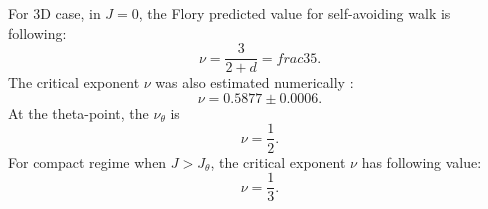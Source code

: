 For 3D case, in $J=0$, the Flory predicted value for self-avoiding walk is following:
\begin{equation}
\label{eq:nu_3D_J0_flory}
 \nu = \frac{3}{2+d} = frac{3}{5}.
\end{equation}
The critical exponent $\nu$ was also estimated numerically \cite{Li1995}:
\begin{equation}
\label{eq:nu_3D_J0_sokal}
\nu = 0.5877 \pm 0.0006.
\end{equation}
 At the theta-point, the $\nu_{\theta}$  is \cite{van2015statistical} 
 \begin{equation}
 \label{eq:nu_3D_Jtheta_flory}
 \nu = \frac{1}{2}.
 \end{equation}
 For compact regime when $J > J_{\theta}$, the critical exponent $\nu$  has following value:  
\begin{equation}
\label{eq:nu_3D_Jglobular_flory}
\nu = \frac{1}{3}.
\end{equation}
